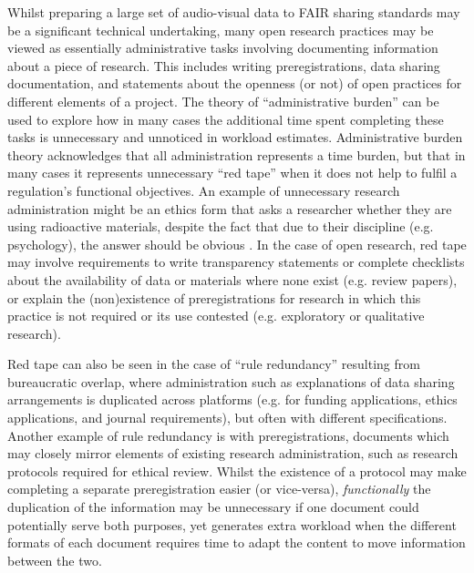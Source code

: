 \documentclass[ authordate, meta, issue]{jote-new-article}
\begin{document}
Whilst preparing a large set of audio-visual data to FAIR sharing standards may be a significant technical undertaking, many open research practices may be viewed as essentially administrative tasks involving documenting information about a piece of research. This includes writing preregistrations, data sharing documentation, and statements about the openness (or not) of open practices for different elements of a project. The theory of “administrative burden” \parencites{Bozeman1993} can be used to explore how in many cases the additional time spent completing these tasks is unnecessary and unnoticed in workload estimates. Administrative burden theory acknowledges that all administration represents a time burden, but that in many cases it represents unnecessary “red tape” when it does not help to fulfil a regulation’s functional objectives. An example of unnecessary research administration might be an ethics form that asks a researcher whether they are using radioactive materials, despite the fact that due to their discipline (e.g. psychology), the answer should be obvious \parencites{Bozeman2020}. In the case of open research, red tape may involve requirements to write transparency statements or complete checklists about the availability of data or materials where none exist (e.g. review papers), or explain the (non)existence of preregistrations for research in which this practice is not required or its use contested (e.g. exploratory or qualitative research).



Red tape can also be seen in the case of “rule redundancy” \parencites{Bozeman2017} resulting from bureaucratic overlap, where administration such as explanations of data sharing arrangements is duplicated across platforms (e.g. for funding applications, ethics applications, and journal requirements), but often with different specifications. Another example of rule redundancy is with preregistrations, documents which may closely mirror elements of existing research administration, such as research protocols required for ethical review. Whilst the existence of a protocol may make completing a separate preregistration easier (or vice-versa), \emph{functionally} the duplication of the information may be unnecessary if one document could potentially serve both purposes, yet generates extra workload when the different formats of each document requires time to adapt the content to move information between the two.
\end{document}
